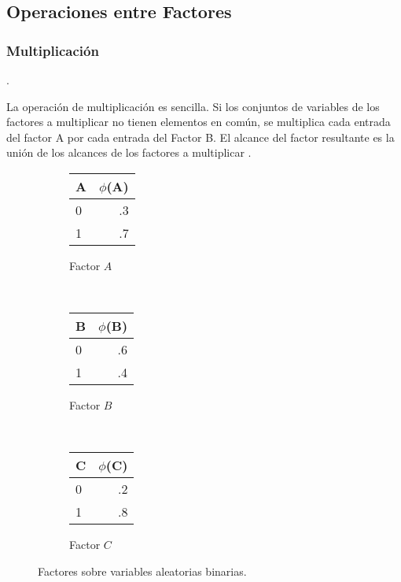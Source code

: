 \subsection[Operaciones]{Operaciones entre Factores}

\subsubsection{Multiplicación}

\begin{definition}[Multiplicación]

\parencite[107]{KollerFriedman2009}.
\end{definition}

La operación de multiplicación es sencilla. Si los conjuntos de variables de los factores a multiplicar no tienen elementos en común, se multiplica cada entrada del factor A por cada entrada del Factor B. El alcance del factor resultante es la unión de los alcances de los factores a multiplicar \parencite[107]{KollerFriedman2009}.


\begin{figure}
    \centering
    \begin{subfigure}[b]{0.3\textwidth}
        \centering
        \begin{tabular}{ l | r }
          A & $\phi$(A)\\ \hline
          0 & .3  \\ \hline
          1 & .7  \\
        \end{tabular}
        \caption{Factor $A$}
    \end{subfigure}
    ~ 
    \begin{subfigure}[b]{0.3\textwidth}
        \centering
        \begin{tabular}{ l | r }
          B & $\phi$(B)\\ \hline
          0 & .6  \\ \hline
          1 & .4  \\
        \end{tabular}
        \caption{Factor $B$}
    \end{subfigure}
    ~
    \begin{subfigure}[b]{0.3\textwidth}
        \centering
        \begin{tabular}{ l | r }
          C & $\phi$(C)\\ \hline
          0 & .2  \\ \hline
          1 & .8  \\
        \end{tabular}
        \caption{Factor $C$}
    \end{subfigure}
    \caption{Factores sobre variables aleatorias binarias.}\label{fig:ABC}
\end{figure}

